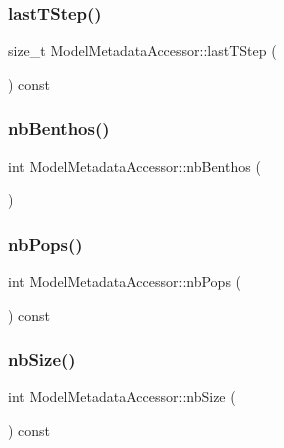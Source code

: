 \subsubsection{\texorpdfstring{lastTStep()}{lastTStep()}}
{\footnotesize\ttfamily size\+\_\+t Model\+Metadata\+Accessor\+::last\+T\+Step (\begin{DoxyParamCaption}{ }\end{DoxyParamCaption}) const}

\mbox{\label{class_model_metadata_accessor_a4a2113bbc8026096bb6060450e8c4f08}} 
\subsubsection{\texorpdfstring{nbBenthos()}{nbBenthos()}}
{\footnotesize\ttfamily int Model\+Metadata\+Accessor\+::nb\+Benthos (\begin{DoxyParamCaption}{ }\end{DoxyParamCaption})}

\mbox{\label{class_model_metadata_accessor_a53a1e115b853064615fe94698dcb3156}} 
\subsubsection{\texorpdfstring{nbPops()}{nbPops()}}
{\footnotesize\ttfamily int Model\+Metadata\+Accessor\+::nb\+Pops (\begin{DoxyParamCaption}{ }\end{DoxyParamCaption}) const}

\mbox{\label{class_model_metadata_accessor_a9fd8fcaef777133aacc006676126ad38}} 
\subsubsection{\texorpdfstring{nbSize()}{nbSize()}}
{\footnotesize\ttfamily int Model\+Metadata\+Accessor\+::nb\+Size (\begin{DoxyParamCaption}{ }\end{DoxyParamCaption}) const}

